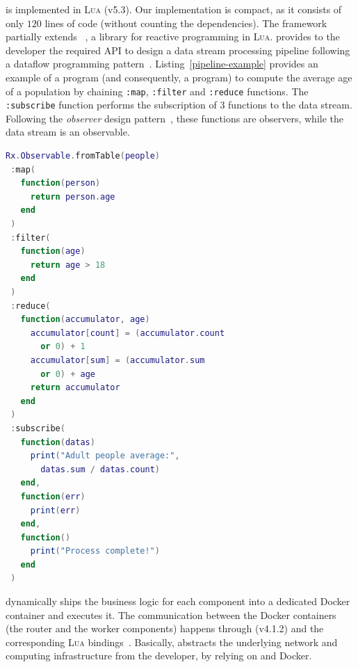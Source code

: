 \SYS{} is implemented in \textsc{Lua} (v5.3).
Our implementation is compact, as it consists of only $120$ lines of code (without counting the dependencies).
The framework partially extends \rxl~\cite{github:rxlua}, a library for reactive programming in \textsc{Lua}.
\rxl provides to the developer the required API to design a data stream processing pipeline following a dataflow programming pattern~\cite{uustalu_essence_2005}.
Listing~\ref{pipeline-example} provides an example of a \rxl program (and consequently, a \SYS{} program) to compute the average age of a population by chaining \texttt{:map}, \texttt{:filter} and \texttt{:reduce} functions.
The \texttt{:subscribe} function performs the subscription of 3 functions to the data stream.
Following the \emph{observer} design pattern~\cite{szallies_using_1997}, these functions are observers, while the data stream is an observable.

\begin{lstlisting}[language=LUA,caption={Example of process pipeline with RxLua.},label=pipeline-example]
Rx.Observable.fromTable(people)
 :map(
   function(person)
     return person.age
   end
 )
 :filter(
   function(age)
     return age > 18
   end
 )
 :reduce(
   function(accumulator, age)
     accumulator[count] = (accumulator.count
       or 0) + 1
     accumulator[sum] = (accumulator.sum
       or 0) + age
     return accumulator
   end
 )
 :subscribe(
   function(datas)
     print("Adult people average:",
       datas.sum / datas.count)
   end,
   function(err)
     print(err)
   end,
   function()
     print("Process complete!")
   end
 )
\end{lstlisting}

\SYS{} dynamically ships the business logic for each component into a dedicated Docker container and executes it.
The communication between the Docker containers (the router and the worker components) happens through \zmq (v4.1.2) and the corresponding \textsc{Lua} bindings~\cite{github:lzmq}.
Basically, \SYS{} abstracts the underlying network and computing infrastructure from the developer, by relying on \zmq and Docker.


